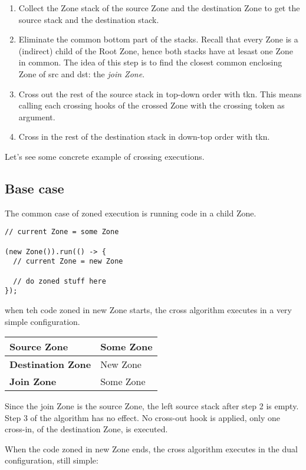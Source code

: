 \begin{enumerate}
\item Collect the Zone stack of the source Zone and the destination Zone to get the source stack and the destination stack.
\item Eliminate the common bottom part of the stacks. Recall that every Zone is a (indirect) child of the Root Zone, hence both stacks have at lesast one Zone in common. The idea of this step is to find the closest common enclosing Zone of src and dst: the \emph{join Zone}.
\item Cross out the rest of the source stack in top-down order with tkn. This means calling each crossing hooks of the crossed Zone with the crossing token as argument.
\item Cross in the rest of the destination stack in down-top order with tkn.
\end{enumerate}

Let's see some concrete example of crossing executions.

\subsection*{Base case}

The common case of zoned execution is running code in a child Zone.

\begin{lstlisting}
// current Zone = some Zone

(new Zone()).run(() -> {
  // current Zone = new Zone

  // do zoned stuff here
});
\end{lstlisting}

when teh code zoned in new Zone starts, the cross algorithm executes in a very simple configuration.

\begin{tabular}{| l | l |}
\hline
\textbf{Source Zone} & Some Zone \\ \hline
\textbf{Destination Zone} & New Zone \\ \hline
\textbf{Join Zone} & Some Zone \\ \hline
\end{tabular}

Since the join Zone is the source Zone, the left source stack after step 2 is empty. Step 3 of the algorithm has no effect. No cross-out hook is applied, only one cross-in, of the destination Zone, is executed.

When the code zoned in new Zone ends, the cross algorithm executes in the dual configuration, still simple:

